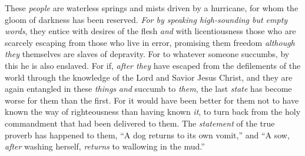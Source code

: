 \begin{biblechapter}
\verse These \textit{people} are waterless springs and mists driven by a hurricane, for whom the gloom of darkness has been reserved.
\verse \textit{For by speaking high-sounding but empty words}, they entice with desires of the flesh \textit{and} with licentiousness those who are scarcely escaping from those who live in error,
\verse promising them freedom \textit{although they} themselves are slaves of depravity. For to whatever someone succumbs, by this he is also enslaved.
\verse For if, \textit{after they} have escaped from the defilements of the world through the knowledge of the Lord and Savior Jesus Christ, and they are again entangled in these \textit{things} \textit{and} succumb to \textit{them}, the last \textit{state} has become worse for them than the first.
\verse For it would have been better for them not to have known the way of righteousness than having known \textit{it}, to turn back from the holy commandment that had been delivered to them.
\verse The \textit{statement} of the true proverb has happened to them, “A dog returns to its own vomit,” and “A sow, \textit{after} washing herself, \textit{returns} to wallowing in the mud.”
\end{biblechapter}

